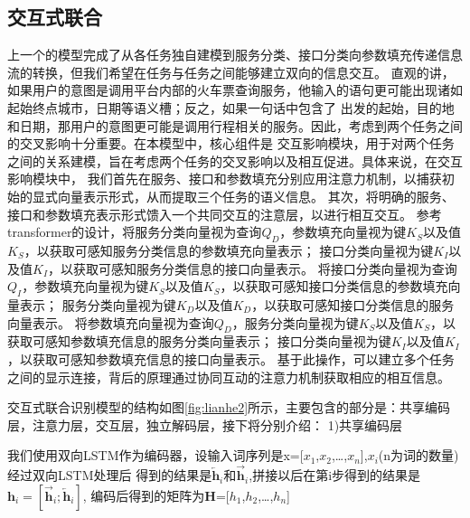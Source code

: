 \subsection{交互式联合}
上一个的模型完成了从各任务独自建模到服务分类、接口分类向参数填充传递信息流的转换，但我们希望在任务与任务之间能够建立双向的信息交互。
直观的讲，如果用户的意图是调用平台内部的火车票查询服务，他输入的语句更可能出现诸如起始终点城市，日期等语义槽；反之，如果一句话中包含了
出发的起始，目的地和日期，那用户的意图更可能是调用行程相关的服务。因此，考虑到两个任务之间的交叉影响十分重要。在本模型中，核心组件是
交互影响模块，用于对两个任务之间的关系建模，旨在考虑两个任务的交叉影响以及相互促进。具体来说，在交互影响模块中，
我们首先在服务、接口和参数填充分别应用注意力机制，以捕获初始的显式向量表示形式，从而提取三个任务的语义信息。
其次，将明确的服务、接口和参数填充表示形式馈入一个共同交互的注意层，以进行相互交互。
参考transformer的设计，将服务分类向量视为查询$Q_D$，参数填充向量视为键$K_S$以及值$K_S$，以获取可感知服务分类信息的参数填充向量表示；
接口分类向量视为键$K_I$以及值$K_I$，以获取可感知服务分类信息的接口向量表示。
将接口分类向量视为查询$Q_I$，参数填充向量视为键$K_S$以及值$K_S$，以获取可感知接口分类信息的参数填充向量表示；
服务分类向量视为键$K_D$以及值$K_D$，以获取可感知接口分类信息的服务向量表示。
将参数填充向量视为查询$Q_D$，服务分类向量视为键$K_S$以及值$K_S$，以获取可感知参数填充信息的服务分类向量表示；
接口分类向量视为键$K_I$以及值$K_I$，以获取可感知参数填充信息的接口向量表示。
基于此操作，可以建立多个任务之间的显示连接，背后的原理通过协同互动的注意力机制获取相应的相互信息。

交互式联合识别模型的结构如图\ref{fig:lianhe2}所示，主要包含的部分是：共享编码层，注意力层，交互层，独立解码层，接下将分别介绍：
1)共享编码层

我们使用双向LSTM作为编码器，设输入词序列是x=[$x_{1}$,$x_{2}$,\dots,$x_{n}$],$x_{i}$(n为词的数量)经过双向LSTM处理后
得到的结果是$\overleftarrow{\mathbf{h}}_{i}$和$\overrightarrow{\mathbf{h}}_{i}$,拼接以后在第i步得到的结果是$\mathbf{h}_{i}=[\overrightarrow{\mathbf{h}}_{i} ;\overleftarrow{\mathbf{h}}_{i}]$,
编码后得到的矩阵为$\mathbf{H}$=[$h_{1}$,$h_{2}$,\dots,$h_{n}$]

